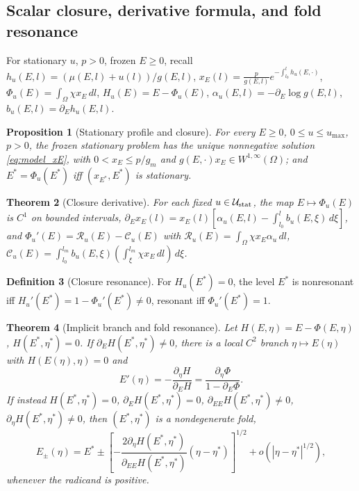 \documentclass[a4paper,fleqn,longmktitle]{cas-sc}
\theoremstyle{plain}
\newtheorem{theorem}{Theorem}[section]
\newtheorem{proposition}[theorem]{Proposition}
\theoremstyle{definition}
\newtheorem{definition}[theorem]{Definition}
\theoremstyle{remark}
\numberwithin{equation}{section}
\begin{document}
\subsection{Scalar closure, derivative formula, and fold resonance}
\label{subsec:main_closure}
For stationary \(u\), \(p>0\), frozen \(E\ge0\), recall
\(h_u(E,l)=(\mu(E,l)+u(l))/g(E,l)\),
\(x_E(l)=\tfrac{p}{g(E,l)}e^{-\int_{l_0}^l h_u(E,\cdot)}\),
\(\Phi_u(E)=\int_\Omega\chi x_E\,dl\), \(H_u(E)=E-\Phi_u(E)\),
\(\alpha_u(E,l)=-\partial_E\log g(E,l)\), \(b_u(E,l)=\partial_Eh_u(E,l)\).
\begin{proposition}[Stationary profile and closure]
\label{prop:main_stationary_profile_closure}
For every \(E\ge0\), \(0\le u\le u_{\max}\), \(p>0\), the frozen stationary
problem has the unique nonnegative solution \eqref{eq:model_xE}, with
\(0<x_E\le p/g_m\) and \(g(E,\cdot)x_E\in W^{1,\infty}(\Omega)\); and
\(E^*=\Phi_u(E^*)\) iff \((x_{E^*},E^*)\) is stationary.
\end{proposition}
\begin{theorem}[Closure derivative]
\label{thm:main_closure_derivative}
For each fixed \(u\in\mathcal U_{\rm stat}\), the map
$E\mapsto \Phi_u(E)$ is \(C^1\) on bounded intervals,
\(\partial_E x_E(l)=x_E(l)[\alpha_u(E,l)-\int_{l_0}^l b_u(E,\xi)\,d\xi]\), and
  $\displaystyle \Phi_u'(E)=\mathcal R_u(E)-\mathcal C_u(E)$
with \(\mathcal R_u(E)=\int_\Omega\chi x_E\alpha_u\,dl\),
\(\mathcal C_u(E)=\int_{l_0}^{l_m}b_u(E,\xi)
(\int_{\xi}^{l_m}\chi x_E\,dl)\,d\xi\).
\end{theorem}
\begin{definition}[Closure resonance]
\label{def:main_closure_resonance}
For \(H_u(E^*)=0\), the level \(E^*\) is nonresonant iff
\(H_u'(E^*)=1-\Phi_u'(E^*)\ne0\), resonant iff \(\Phi_u'(E^*)=1\).
\end{definition}
\begin{theorem}[Implicit branch and fold resonance]
\label{thm:main_fold_resonance}
Let \(H(E,\eta)=E-\Phi(E,\eta)\), \(H(E^*,\eta^*)=0\). If
\(\partial_EH(E^*,\eta^*)\ne0\), there is a local \(C^2\) branch
\(\eta\mapsto E(\eta)\) with \(H(E(\eta),\eta)=0\) and
\[
    E'(\eta)
    =
    -\frac{\partial_\eta H}{\partial_EH}
    =
    \frac{\partial_\eta\Phi}{1-\partial_E\Phi} .
\]
If instead \(H(E^*,\eta^*)=0\), \(\partial_EH(E^*,\eta^*)=0\),
\(\partial_{EE}H(E^*,\eta^*)\ne0\), \(\partial_\eta H(E^*,\eta^*)\ne0\), then
\((E^*,\eta^*)\) is a nondegenerate fold,
\begin{equation}
    \label{eq:main_fold_branches}
    E_\pm(\eta)
    =
    E^*
    \pm
    \left[
        -\frac{2\partial_\eta H(E^*,\eta^*)}
        {\partial_{EE}H(E^*,\eta^*)}
        (\eta-\eta^*)
    \right]^{1/2}
    +
    o(|\eta-\eta^*|^{1/2}),
\end{equation}
whenever the radicand is positive.
\end{theorem}
\end{document}
